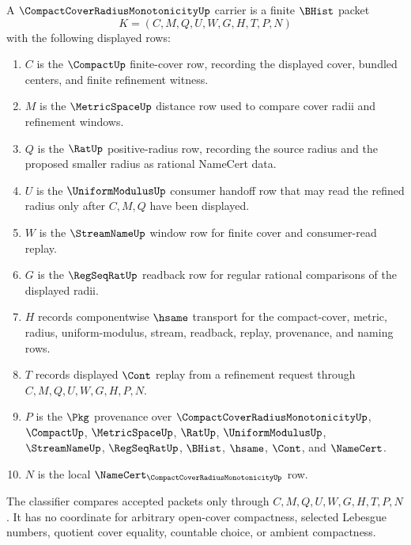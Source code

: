 \begin{definition}
\label{def:compact-cover-radius-monotonicity-carrier}
A $\CompactCoverRadiusMonotonicityUp$ carrier is a finite $\BHist$ packet
$$
K=(C,M,Q,U,W,G,H,T,P,N)
$$
with the following displayed rows:
\begin{enumerate}
\item $C$ is the $\CompactUp$ finite-cover row, recording the displayed cover, bundled centers, and finite refinement witness.
\item $M$ is the $\MetricSpaceUp$ distance row used to compare cover radii and refinement windows.
\item $Q$ is the $\RatUp$ positive-radius row, recording the source radius and the proposed smaller radius as rational NameCert data.
\item $U$ is the $\UniformModulusUp$ consumer handoff row that may read the refined radius only after $C,M,Q$ have been displayed.
\item $W$ is the $\StreamNameUp$ window row for finite cover and consumer-read replay.
\item $G$ is the $\RegSeqRatUp$ readback row for regular rational comparisons of the displayed radii.
\item $H$ records componentwise $\hsame$ transport for the compact-cover, metric, radius, uniform-modulus, stream, readback, replay, provenance, and naming rows.
\item $T$ records displayed $\Cont$ replay from a refinement request through $C,M,Q,U,W,G,H,P,N$.
\item $P$ is the $\Pkg$ provenance over $\CompactCoverRadiusMonotonicityUp$, $\CompactUp$, $\MetricSpaceUp$, $\RatUp$, $\UniformModulusUp$, $\StreamNameUp$, $\RegSeqRatUp$, $\BHist$, $\hsame$, $\Cont$, and $\NameCert$.
\item $N$ is the local $\NameCert_{\CompactCoverRadiusMonotonicityUp}$ row.
\end{enumerate}
The classifier compares accepted packets only through $C,M,Q,U,W,G,H,T,P,N$. It has no coordinate for arbitrary open-cover compactness, selected Lebesgue numbers, quotient cover equality, countable choice, or ambient compactness.
\end{definition}


